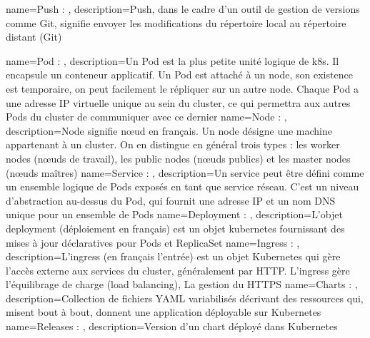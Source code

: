 {
    name=Push : ,
    description={Push, dans le cadre d'un outil de gestion de versions comme Git, signifie envoyer les modifications du répertoire local au répertoire distant (Git)}
}

{
    name=Pod : ,
    description={Un Pod est la plus petite unité logique de k8s. Il encapsule un conteneur applicatif. Un Pod est attaché à un node, son existence est temporaire, on peut facilement le répliquer sur un autre node. Chaque Pod a une adresse IP virtuelle unique au sein du cluster, ce qui permettra aux autres Pods du cluster de communiquer avec ce dernier}
}
{
    name=Node : ,
    description={Node signifie nœud en français. Un node désigne une machine appartenant à un cluster. On en distingue en général trois types : les worker nodes (nœuds de travail), les public nodes (nœuds publics) et les master nodes (nœuds maîtres)}
}
{
    name=Service : ,
    description={Un service peut être défini comme un ensemble logique de Pods exposés en tant que service réseau. C’est un niveau d’abstraction au-dessus du Pod, qui fournit une adresse IP et un nom DNS unique pour un ensemble de Pods}
}
{
    name=Deployment : ,
    description={L'objet deployment (déploiement en français) est un objet kubernetes fournissant des mises à jour déclaratives pour Pods et ReplicaSet}
}
{
    name=Ingress : ,
    description={L'ingress (en français l'entrée) est un objet Kubernetes qui gère l'accès externe aux services du cluster, généralement par HTTP. L'ingress gère l'équilibrage de charge (load balancing), La gestion du HTTPS}
}
{
    name=Charts : ,
    description={Collection de fichiers YAML variabilisés décrivant des ressources qui, misent bout à bout, donnent une application déployable sur Kubernetes}
}
{
    name=Releases : ,
    description={Version d'un chart déployé dans Kubernetes}
}

